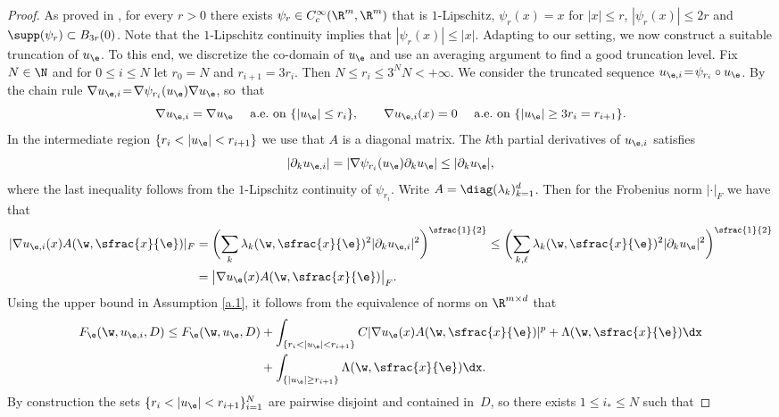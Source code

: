 \begin{proof}
As proved in \cite[\S 4]{CDMSZ18}, for every $r>0$ there exists $\psi_{r}\in C_c^{\infty}(\R^m,\R^m)$ that is $1$-Lipschitz, $\psi_r(x)=x$ for $|x|\leq r$, $|\psi_r(x)|\leq 2r$ and $\supp (\psi_r)\subset B_{3r}(0)$. Note that the $1$-Lipschitz continuity implies that $|\psi_r(x)|\leq |x|$. Adapting \cite[Lem.\,4.1]{CDMSZ18} to our setting, we now construct a suitable truncation of $u_{\e}$. To this end, we discretize the co-domain of $u_{\e}$ and use an averaging argument to find a good truncation level. Fix $N\in\N$ and for $0\leq i\leq N$ let $r_{0}=N$ and $r_{i+1}=3r_i$. Then $N\leq r_i\leq 3^NN<+\infty$. We consider the truncated sequence $u_{\e,i}\!=\!\psi_{r_{i}}\circ u_{\e}$. By the chain rule $\nabla u_{\e,i}\!=\!\nabla \psi_{r_i}(u_{\e})\nabla u_{\e}$, so~that
\begin{equation*}
\nabla u_{\e,i}=\nabla u_{\e}\quad\text{ a.e.\ on }\{|u_{\e}|\leq r_i\},
\quad\quad
\nabla u_{\e,i}(x)=0\quad\text{ a.e.\ on }\{|u_{\e}|\geq 3r_i=r_{i+1}\}.
\end{equation*}
In the intermediate region $\{r_i<|u_{\e}|<r_{i+1}\}$ we use that $A$ is a diagonal matrix. The $k$th partial derivatives of $u_{\e,i}$ satisfies
\begin{equation*}
|\partial_k u_{\e,i}|=|\nabla \psi_{r_i}(u_{\e})\partial_ku_{\e}|\leq |\partial_k u_{\e}|,
\end{equation*}
where the last inequality follows from the $1$-Lipschitz continuity of $\psi_{r_i}$. Write $A=\diag(\lambda_{k})_{k=1}^d$. Then for the Frobenius norm $|\cdot|_F$ we have that
\begin{align*}
|\nabla u_{\e,i}(x)A(\w,\sfrac{x}{\e})|_F&=\biggl(\sum_{k}\lambda_{k}(\w,\sfrac{x}{\e})^2|\partial_{k}u_{\e,i}|^2\biggr)^{\sfrac{1}{2}}\leq\biggl(\sum_{k,\ell}\lambda_{k}(\w,\sfrac{x}{\e})^2|\partial_k u_{\e}|^2\biggr)^{\sfrac{1}{2}}
\\
&=\bigl|\nabla u_{\e}(x)A(\w,\sfrac{x}{\e})\bigr|_F.
\end{align*}
Using the upper bound in Assumption \ref{a.1}, it follows from the equivalence of norms on $\R^{m\times d}$ that
\begin{align*}
F_{\e}(\w,u_{\e,i},D)\leq F_{\e}(\w,u_{\e},D)&+\int_{\{r_i< |u_{\e}|< r_{i+1}\}}C|\nabla u_{\e}(x)A(\w,\sfrac{x}{\e})|^p+\Lambda(\w,\sfrac{x}{\e})\dx
\\
& +\int_{\{|u_{\e}|\geq r_{i+1}\}}\Lambda(\w,\sfrac{x}{\e})\dx.
\end{align*}
By construction the sets $\{r_i< |u_{\e}|< r_{i+1}\}_{i=1}^N$ are pairwise disjoint and contained in~$D$, so there exists $1\leq i_*\leq N$ such that

\end{proof}
